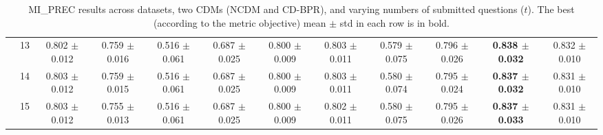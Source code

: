 \begin{table*}[t]
{\begin{tabular}{%
  ll
  @{\quad}
  c@{\hskip 4pt}c
  @{\quad\quad}
  c@{\hskip 4pt}c
  @{\quad\quad}
  c@{\hskip 4pt}c
  @{\quad\quad}
  c@{\hskip 4pt}c
  @{\quad\quad}
  c@{\hskip 4pt}c
}
        & 13 & 0.802 $\pm$ 0.012 & 0.759 $\pm$ 0.016 & 0.516 $\pm$ 0.061 & 0.687 $\pm$ 0.025 & 0.800 $\pm$ 0.009 & 0.803 $\pm$ 0.011 & 0.579 $\pm$ 0.075 & 0.796 $\pm$ 0.026 & \textbf{0.838 $\pm$ 0.032} & 0.832 $\pm$ 0.010 \\
        & 14 & 0.803 $\pm$ 0.012 & 0.759 $\pm$ 0.015 & 0.516 $\pm$ 0.061 & 0.687 $\pm$ 0.025 & 0.800 $\pm$ 0.009 & 0.803 $\pm$ 0.011 & 0.580 $\pm$ 0.074 & 0.795 $\pm$ 0.024 & \textbf{0.837 $\pm$ 0.032} & 0.831 $\pm$ 0.010 \\
        & 15 & 0.803 $\pm$ 0.012 & 0.755 $\pm$ 0.013 & 0.516 $\pm$ 0.061 & 0.687 $\pm$ 0.025 & 0.800 $\pm$ 0.009 & 0.802 $\pm$ 0.011 & 0.580 $\pm$ 0.075 & 0.795 $\pm$ 0.026 & \textbf{0.837 $\pm$ 0.033} & 0.831 $\pm$ 0.010 \\
\bottomrule
\end{tabular}
}
\caption{MI_PREC results across datasets, two CDMs (NCDM and CD-BPR), and varying numbers of submitted questions ($t$). The best (according to the metric objective) mean $\pm$ std in each row is in bold.}
\label{tab:results-mi_prec}
\end{table*}


